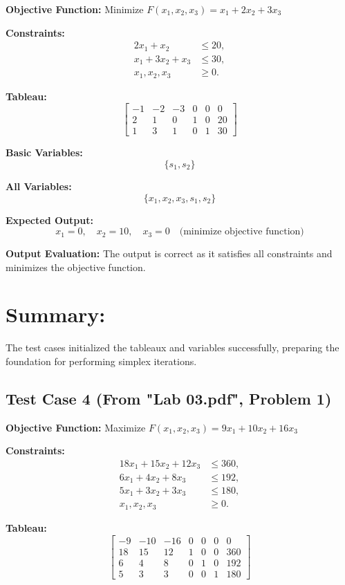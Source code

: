 \documentclass[12pt, legalpaper]{exam}
\begin{document}
\textbf{Objective Function:} Minimize \( F(x_1, x_2, x_3) = x_1 + 2x_2 + 3x_3 \)

\textbf{Constraints:}
\[
\begin{aligned}
2x_1 + x_2 &\leq 20, \\
x_1 + 3x_2 + x_3 &\leq 30, \\
x_1, x_2, x_3 &\geq 0.
\end{aligned}
\]

\textbf{Tableau:}
\[
\begin{bmatrix}
-1 & -2 & -3 & 0 & 0 & 0 \\
2 & 1 & 0 & 1 & 0 & 20 \\
1 & 3 & 1 & 0 & 1 & 30
\end{bmatrix}
\]

\textbf{Basic Variables:}
\[
\{ s_1, s_2 \}
\]

\textbf{All Variables:}
\[
\{ x_1, x_2, x_3, s_1, s_2 \}
\]

\textbf{Expected Output:}
\[
x_1 = 0, \quad x_2 = 10, \quad x_3 = 0 \quad \text{(minimize objective function)}
\]

\textbf{Output Evaluation:} The output is correct as it satisfies all constraints and minimizes the objective function.

\section*{Summary:}
The test cases initialized the tableaux and variables successfully, preparing the foundation for performing simplex iterations.
\subsection*{Test Case 4 (From "Lab 03.pdf", Problem 1)}

\textbf{Objective Function:} Maximize \( F(x_1, x_2, x_3) = 9x_1 + 10x_2 + 16x_3 \)

\textbf{Constraints:}
\[
\begin{aligned}
18x_1 + 15x_2 + 12x_3 &\leq 360, \\
6x_1 + 4x_2 + 8x_3 &\leq 192, \\
5x_1 + 3x_2 + 3x_3 &\leq 180, \\
x_1, x_2, x_3 &\geq 0.
\end{aligned}
\]

\textbf{Tableau:}
\[
\begin{bmatrix}
-9 & -10 & -16 & 0 & 0 & 0 & 0 \\
18 & 15 & 12 & 1 & 0 & 0 & 360 \\
6 & 4 & 8 & 0 & 1 & 0 & 192 \\
5 & 3 & 3 & 0 & 0 & 1 & 180
\end{bmatrix}
\]
\end{document}
